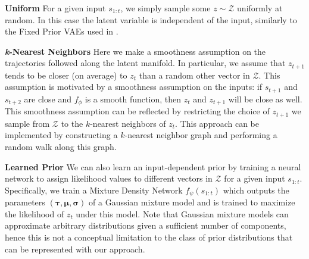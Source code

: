 \documentclass{article}
\begin{document}



\textbf{Uniform} \quad
For a given input $s_{1:t}$, we simply sample some $z \sim \mathcal{Z}$ uniformly at random. In this case the latent variable is independent of the input, similarly to the Fixed Prior VAEs used in \citep{Denton18}.

\textbf{\emph{k}-Nearest Neighbors} \quad
Here we make a smoothness assumption on the trajectories followed along the latent manifold.
In particular, we assume that $z_{t+1}$ tends to be closer (on average) to $z_t$ than a random other vector in $\mathcal{Z}$.
This assumption is motivated by a smoothness assumption on the inputs: if $s_{t+1}$ and $s_{t+2}$ are close and $f_\phi$ is a smooth function, then $z_t$ and $z_{t+1}$ will be close as well.
This smoothness assumption can be reflected by restricting the choice of $z_{t+1}$ we sample from $\mathcal{Z}$ to the $k$-nearest neighbors of $z_t$.
This approach can be implemented by constructing a $k$-nearest neighbor graph and performing a random walk along this graph.

\textbf{Learned Prior} \quad
We can also learn an input-dependent prior by training a neural network to assign likelihood values to different vectors in $\mathcal{Z}$ for a given input $s_{1:t}$.
Specifically, we train a Mixture Density Network \citep{mixture-density-networks} $f_\psi(s_{1:t})$ which outputs the parameters $(\bm{\tau}, \bm{\mu}, \bm{\sigma})$ of a Gaussian mixture model and is trained to maximize the likelihood of $z_t$ under this model.
Note that Gaussian mixture models can approximate arbitrary distributions given a sufficient number of components, hence this is not a conceptual limitation to the class of prior distributions that can be represented with our approach.
\end{document}
